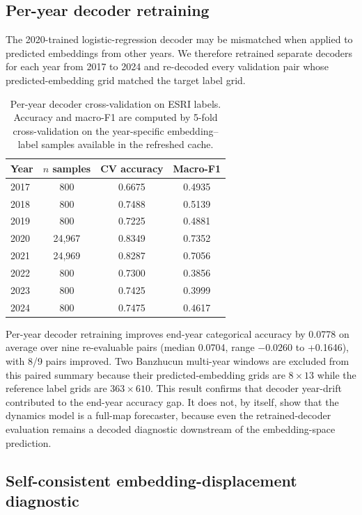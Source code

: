 \documentclass{article}
\begin{document}
\subsection{Per-year decoder retraining}
\label{sec:peryear_decoder}

The 2020-trained logistic-regression decoder may be mismatched when applied to predicted embeddings from other years. We therefore retrained separate decoders for each year from 2017 to 2024 and re-decoded every validation pair whose predicted-embedding grid matched the target label grid.

\begin{table}[htbp]
\centering
\caption{Per-year decoder cross-validation on ESRI labels. Accuracy and macro-F1 are computed by 5-fold cross-validation on the year-specific embedding--label samples available in the refreshed cache.}
\label{tab:decoder_by_year}
\small
\begin{tabular}{lccc}
\toprule
Year & $n$ samples & CV accuracy & Macro-F1 \\
\midrule
2017 & 800 & 0.6675 & 0.4935 \\
2018 & 800 & 0.7488 & 0.5139 \\
2019 & 800 & 0.7225 & 0.4881 \\
2020 & 24,967 & 0.8349 & 0.7352 \\
2021 & 24,969 & 0.8287 & 0.7056 \\
2022 & 800 & 0.7300 & 0.3856 \\
2023 & 800 & 0.7425 & 0.3999 \\
2024 & 800 & 0.7475 & 0.4617 \\
\bottomrule
\end{tabular}
\end{table}

Per-year decoder retraining improves end-year categorical accuracy by 0.0778 on average over nine re-evaluable pairs (median 0.0704, range $-0.0260$ to +0.1646), with 8/9 pairs improved. Two Banzhucun multi-year windows are excluded from this paired summary because their predicted-embedding grids are $8\times13$ while the reference label grids are $363\times610$. This result confirms that decoder year-drift contributed to the end-year accuracy gap. It does not, by itself, show that the dynamics model is a full-map forecaster, because even the retrained-decoder evaluation remains a decoded diagnostic downstream of the embedding-space prediction.

\subsection{Self-consistent embedding-displacement diagnostic}
\label{sec:embedding_displacement_diagnostic}
\end{document}
